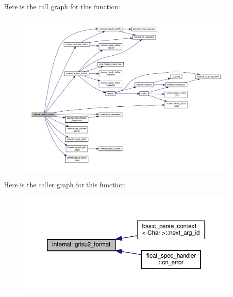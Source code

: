 Here is the call graph for this function\+:
\nopagebreak
\begin{figure}[H]
\begin{center}
\leavevmode
\includegraphics[width=350pt]{namespaceinternal_af9ded6caf43e3045bce5bfdd382284ed_cgraph}
\end{center}
\end{figure}
Here is the caller graph for this function\+:
\nopagebreak
\begin{figure}[H]
\begin{center}
\leavevmode
\includegraphics[width=341pt]{namespaceinternal_af9ded6caf43e3045bce5bfdd382284ed_icgraph}
\end{center}
\end{figure}
\mbox{\label{namespaceinternal_aa6ca58c625a66aa96f3839eb3bfe2f6e}} 
